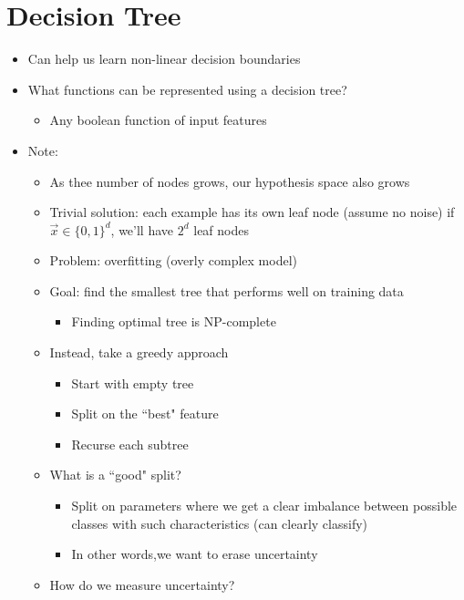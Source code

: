\documentclass[10pt, oneside]{article}
\begin{document}
\section{Decision Tree}
\begin{itemize}
    \item Can help us learn non-linear decision boundaries
    \item What functions can be represented using a decision tree?
    \begin{itemize}
        \item Any boolean function of input features
    \end{itemize}
    \item Note:
    \begin{itemize}
        \item As thee number of nodes grows, our hypothesis space also grows
        \item Trivial solution: each example has its own leaf node (assume no noise) if $\vec x\in\{0,1\}^d$, we'll have $2^d$ leaf nodes
        \item Problem: overfitting (overly complex model)
        \item Goal: find the smallest tree that performs well on training data
        \begin{itemize}
            \item Finding optimal tree is NP-complete
        \end{itemize}
        \item Instead, take a greedy approach
        \begin{itemize}
            \item Start with empty tree
            \item Split on the ``best" feature
            \item Recurse each subtree
        \end{itemize}
        \item What is a ``good" split?
        \begin{itemize}
            \item Split on parameters where we get a clear imbalance between possible classes with such characteristics (can clearly classify)
            \item In other words,we want to erase uncertainty
        \end{itemize}
        \item How do we measure uncertainty?
        \begin{itemize}

\end{itemize}
\end{itemize}
\end{itemize}
\end{document}
